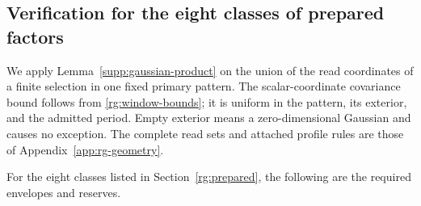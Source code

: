 \subsection{Verification for the eight classes of prepared factors}
\label{app:joint-application}

We apply Lemma~\ref{supp:gaussian-product} on the union of the read
coordinates of a finite selection in one fixed primary pattern.
The scalar-coordinate covariance bound follows from
\eqref{rg:window-bounds}; it is uniform in the pattern, its exterior,
and the admitted period. Empty exterior means a zero-dimensional
Gaussian and causes no exception. The complete read sets and attached
profile rules are those of Appendix~\ref{app:rg-geometry}.

For the eight classes listed in Section~\ref{rg:prepared}, the following
are the required envelopes and reserves.
